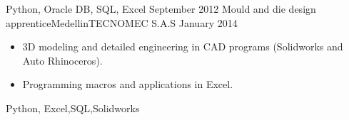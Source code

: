 \begin{experiences}
{\begin{itemize}
                      \end{itemize}
                    }
                    {Python, Oracle DB, SQL, Excel}
  \emptySeparator
  \experience
  {September 2012}       {Mould and die design apprentice}{Medellin}{TECNOMEC S.A.S}
  {January 2014}
                    {
                      \begin{itemize}
                        \item 3D modeling and detailed engineering in CAD programs (Solidworks and Auto Rhinoceros).                              
                        \item Programming macros and applications in Excel.           
                     
                      \end{itemize}
                    }
                    {Python, Excel,SQL,Solidworks}
  
  \emptySeparator            

\end{experiences}
